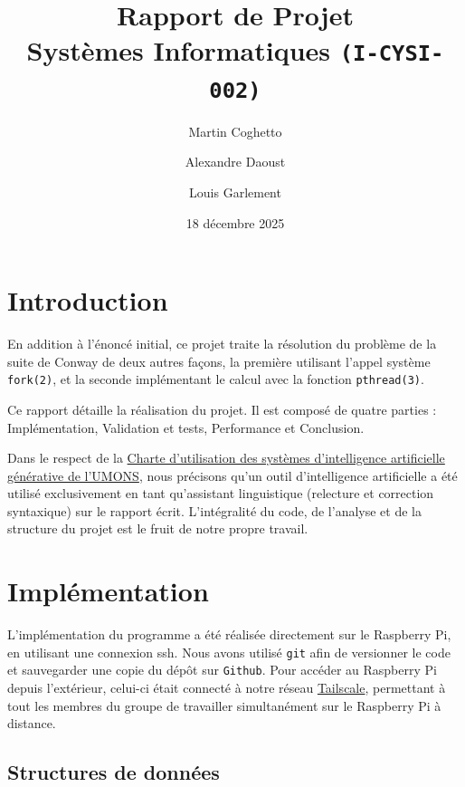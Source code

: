 \documentclass[a4paper,11pt]{article}
\title{
  \vspace{2cm}
  \textbf{\Huge Rapport de Projet}\\[0.4cm]
  \large Systèmes Informatiques \texttt{(I-CYSI-002)}
}
\author{
  Martin Coghetto \and Alexandre Daoust \and Louis Garlement \\
}
\date{18 décembre 2025}
\begin{document}
\maketitle
\thispagestyle{empty}
\newpage
\tableofcontents
\newpage


\section{Introduction}

En addition à l'énoncé initial, ce projet traite la résolution du problème de la suite de Conway de deux autres façons, la première utilisant l'appel système \texttt{fork(2)}, et la seconde implémentant le calcul avec la fonction \texttt{pthread(3)}.

Ce rapport détaille la réalisation du projet. Il est composé de quatre parties : Implémentation, Validation et tests, Performance et Conclusion.




Dans le respect de la \href{https://web.umons.ac.be/app/uploads/sites/34/2024/05/CharteIA-UMONS.pdf}{Charte d'utilisation des systèmes d’intelligence artificielle générative de l'UMONS}, nous précisons qu'un outil d'intelligence artificielle a été utilisé exclusivement en tant qu'assistant linguistique (relecture et correction syntaxique) sur le rapport écrit. L'intégralité du code, de l'analyse et de la structure du projet est le fruit de notre propre travail.

\section{Implémentation} 

L'implémentation du programme a été réalisée directement sur le Raspberry Pi, en utilisant une connexion ssh. Nous avons utilisé \texttt{git} afin de versionner le code et sauvegarder une copie du dépôt sur \texttt{Github}. Pour accéder au Raspberry Pi depuis l'extérieur, celui-ci était connecté à notre réseau \href{https://tailscale.com/}{Tailscale}, permettant à tout les membres du groupe de travailler simultanément sur le Raspberry Pi à distance.


\subsection{Structures de données}
\end{document}
